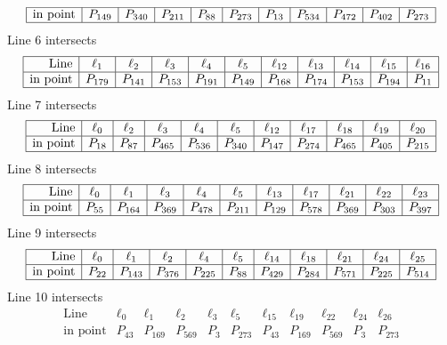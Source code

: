 \documentclass{article}
\begin{document}
{$$\begin{array}{|r*{10}{|c}|}
\hline
\mbox{in point}  & P_{149} & P_{340} & P_{211} & P_{88} & P_{273} & P_{13} & P_{534} & P_{472} & P_{402} & P_{273}\\
\hline
\end{array}
$$
Line 6 intersects 
$$
\begin{array}{|r*{10}{|c}|}
\hline
\mbox{Line}  & \ell_{1} & \ell_{2} & \ell_{3} & \ell_{4} & \ell_{5} & \ell_{12} & \ell_{13} & \ell_{14} & \ell_{15} & \ell_{16}\\
\hline
\mbox{in point}  & P_{179} & P_{141} & P_{153} & P_{191} & P_{149} & P_{168} & P_{174} & P_{153} & P_{194} & P_{11}\\
\hline
\end{array}
$$
Line 7 intersects 
$$
\begin{array}{|r*{10}{|c}|}
\hline
\mbox{Line}  & \ell_{0} & \ell_{2} & \ell_{3} & \ell_{4} & \ell_{5} & \ell_{12} & \ell_{17} & \ell_{18} & \ell_{19} & \ell_{20}\\
\hline
\mbox{in point}  & P_{18} & P_{87} & P_{465} & P_{536} & P_{340} & P_{147} & P_{274} & P_{465} & P_{405} & P_{215}\\
\hline
\end{array}
$$
Line 8 intersects 
$$
\begin{array}{|r*{10}{|c}|}
\hline
\mbox{Line}  & \ell_{0} & \ell_{1} & \ell_{3} & \ell_{4} & \ell_{5} & \ell_{13} & \ell_{17} & \ell_{21} & \ell_{22} & \ell_{23}\\
\hline
\mbox{in point}  & P_{55} & P_{164} & P_{369} & P_{478} & P_{211} & P_{129} & P_{578} & P_{369} & P_{303} & P_{397}\\
\hline
\end{array}
$$
Line 9 intersects 
$$
\begin{array}{|r*{10}{|c}|}
\hline
\mbox{Line}  & \ell_{0} & \ell_{1} & \ell_{2} & \ell_{4} & \ell_{5} & \ell_{14} & \ell_{18} & \ell_{21} & \ell_{24} & \ell_{25}\\
\hline
\mbox{in point}  & P_{22} & P_{143} & P_{376} & P_{225} & P_{88} & P_{429} & P_{284} & P_{571} & P_{225} & P_{514}\\
\hline
\end{array}
$$
Line 10 intersects 
$$
\begin{array}{|r*{10}{|c}|}
\hline
\mbox{Line}  & \ell_{0} & \ell_{1} & \ell_{2} & \ell_{3} & \ell_{5} & \ell_{15} & \ell_{19} & \ell_{22} & \ell_{24} & \ell_{26}\\
\hline
\mbox{in point}  & P_{43} & P_{169} & P_{569} & P_{3} & P_{273} & P_{43} & P_{169} & P_{569} & P_{3} & P_{273}\\

\end{array}$$}
\end{document}
